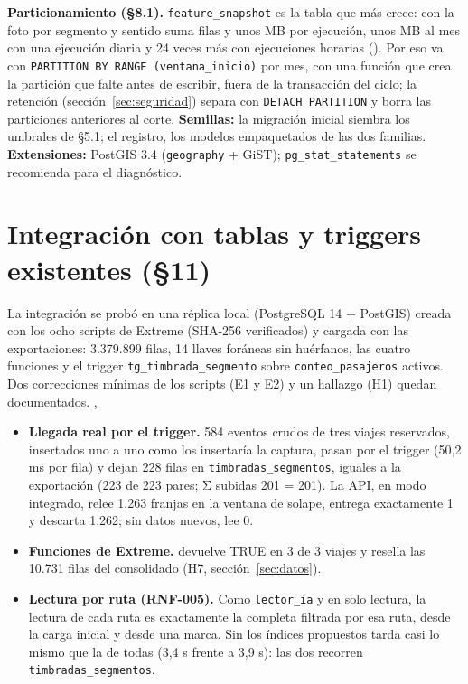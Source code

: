 \documentclass[10pt,a4paper]{article}
\begin{document}
\textbf{Particionamiento (§8.1).} \texttt{feature\_snapshot} es la tabla que más crece: con la foto por segmento y
sentido suma \FotoFilasSegmento{} filas y unos \FotoMBEjecucion{} MB por ejecución, unos \FotoMBMes{} MB al mes con una
ejecución diaria y 24 veces más con ejecuciones horarias (). Por eso va con
\texttt{PARTITION BY RANGE (ventana\_inicio)} por mes, con una función que crea la partición que falte antes de
escribir, fuera de la transacción del ciclo; la retención (sección~\ref{sec:seguridad}) separa con \texttt{DETACH
PARTITION} y borra las particiones anteriores al corte. \textbf{Semillas:} la
migración inicial siembra los umbrales de §5.1; el registro, los modelos empaquetados de las dos familias. \textbf{Extensiones:} PostGIS 3.4 (\texttt{geography} + GiST); \texttt{pg\_stat\_statements}
se recomienda para el diagnóstico.

\section{Integración con tablas y triggers existentes (§11)}
\label{sec:integracion}
La integración se probó en una réplica local (PostgreSQL 14 + PostGIS) creada con los ocho scripts de Extreme (SHA-256
verificados) y cargada con las exportaciones: 3.379.899 filas, 14 llaves foráneas sin huérfanos, las cuatro funciones y
el trigger \texttt{tg\_timbrada\_segmento} sobre \texttt{conteo\_pasajeros} activos. Dos correcciones mínimas de los
scripts (E1 y E2) y un hallazgo (H1) quedan documentados.
, 

\begin{itemize}
\item \textbf{Llegada real por el trigger.} 584 eventos crudos de tres viajes reservados, insertados uno a uno como
  los insertaría la captura, pasan por el trigger (50,2 ms por fila) y dejan 228 filas en \texttt{timbradas\_segmentos},
  iguales a la exportación (223 de 223 pares; Σ subidas 201 = 201). La API, en modo integrado, relee 1.263 franjas en
  la ventana de solape, entrega exactamente 1 y descarta 1.262; sin datos nuevos, lee 0.
\item \textbf{Funciones de Extreme.}  devuelve TRUE en 3 de 3 viajes y
   resella las 10.731 filas del consolidado (H7, sección~\ref{sec:datos}).
\item \textbf{Lectura por ruta (RNF-005).} Como \texttt{lector\_ia} y en solo lectura, la lectura de cada ruta es
  exactamente la completa filtrada por esa ruta, desde la carga inicial y desde una marca. Sin los índices propuestos
  tarda casi lo mismo que la de todas (3,4 s frente a 3,9 s): las dos recorren \texttt{timbradas\_segmentos}.
\end{itemize}
\end{document}
